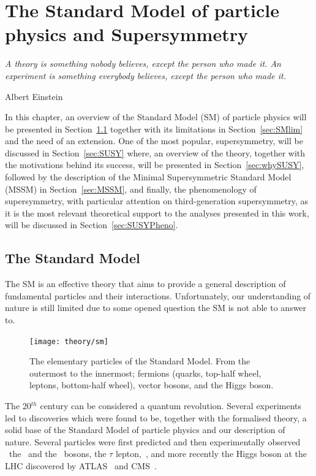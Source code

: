 \chapter{The Standard Model of particle physics and Supersymmetry}
\label{ch:theory} 
\epigraph{\emph{A theory is something nobody believes, except the person who made it. An experiment is something everybody believes, except the person who made it.}} {Albert Einstein}

	In this chapter, an overview of the Standard Model (SM) of particle physics will be presented in Section~\ref{sec:SMov} together with its limitations in Section~\ref{sec:SMlim} and the need of an extension. One of the most popular, supersymmetry, will be discussed in Section~\ref{sec:SUSY} where, an overview of the theory, together with the motivations behind its success, will be presented in Section~\ref{sec:whySUSY}, followed by the description of the Minimal Supersymmetric Standard Model (MSSM) in Section~\ref{sec:MSSM}, and finally, the phenomenology of supersymmetry, with particular attention on third-generation supersymmetry, as it is the most relevant theoretical support to the analyses presented in this work, will be discussed in Section~\ref{sec:SUSYPheno}.



	\section{The Standard Model}
	\label{sec:SMov}

		The SM is an effective theory that aims to provide a general description of fundamental particles and their interactions. Unfortunately, our understanding of nature is still limited due to some opened question the SM is not able to answer to.

		\begin{figure}
			\centering
				\texttt{[image: theory/sm]}
			\caption{\label{fig:sm_el_part} The elementary particles of the Standard Model. From the outermost to the innermost; fermions (quarks, top-half wheel, leptons, bottom-half wheel), vector bosons, and the Higgs boson.} %
		\end{figure}

		The 20$^{th}$ century can be considered a quantum revolution. Several experiments led to discoveries which were found to be, together with the formalised theory, a solid base of the Standard Model of particle physics and our description of nature. Several particles were first predicted and then experimentally observed \eg\ the \Wboson\ and the \Zboson\ bosons, the $\tau$ lepton,~\cite{Herrero1998}, and more recently the Higgs boson at the LHC discovered by ATLAS~\cite{ATLASHiggs2012} and CMS~\cite{CMSHiggs2012}.

